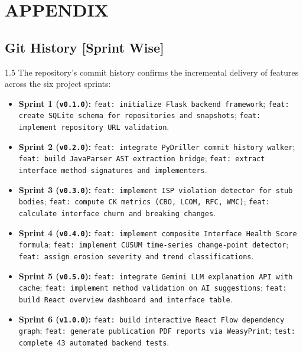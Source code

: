 \documentclass[12pt,a4paper]{article}
\begin{document}
\section{APPENDIX}

\subsection{Git History [Sprint Wise]}
\begin{spacing}{1.5}
\justifying
The repository's commit history confirms the incremental delivery of features across the six project sprints:
\begin{itemize}[leftmargin=*,itemsep=2pt]
  \item \textbf{Sprint 1 (\texttt{v0.1.0}):}
        \texttt{feat: initialize Flask backend framework};
        \texttt{feat: create SQLite schema for repositories and snapshots};
        \texttt{feat: implement repository URL validation}.
  \item \textbf{Sprint 2 (\texttt{v0.2.0}):}
        \texttt{feat: integrate PyDriller commit history walker};
        \texttt{feat: build JavaParser AST extraction bridge};
        \texttt{feat: extract interface method signatures and implementers}.
  \item \textbf{Sprint 3 (\texttt{v0.3.0}):}
        \texttt{feat: implement ISP violation detector for stub bodies};
        \texttt{feat: compute CK metrics (CBO, LCOM, RFC, WMC)};
        \texttt{feat: calculate interface churn and breaking changes}.
  \item \textbf{Sprint 4 (\texttt{v0.4.0}):}
        \texttt{feat: implement composite Interface Health Score formula};
        \texttt{feat: implement CUSUM time-series change-point detector};
        \texttt{feat: assign erosion severity and trend classifications}.
  \item \textbf{Sprint 5 (\texttt{v0.5.0}):}
        \texttt{feat: integrate Gemini LLM explanation API with cache};
        \texttt{feat: implement method validation on AI suggestions};
        \texttt{feat: build React overview dashboard and interface table}.
  \item \textbf{Sprint 6 (\texttt{v1.0.0}):}
        \texttt{feat: build interactive React Flow dependency graph};
        \texttt{feat: generate publication PDF reports via WeasyPrint};
        \texttt{test: complete 43 automated backend tests}.
\end{itemize}
\end{spacing}

\clearpage
\end{document}
